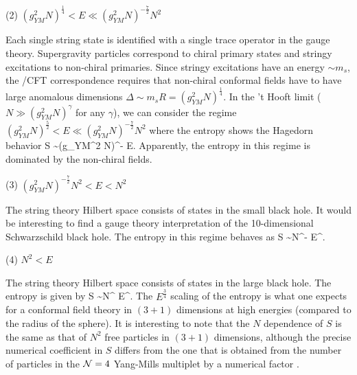 \noindent
(2) $(g_{YM}^2N)^{\frac{1}{4}} < E \ll (g_{YM}^2
    N)^{-\frac{7}{2}} N^2$

Each single string state is identified with a single
trace operator in the gauge theory. Supergravity
particles correspond to chiral primary states and
stringy excitations to non-chiral primaries.
Since stringy excitations have an energy $\sim m_s$,
the \ads/CFT correspondence
requires that non-chiral conformal fields have to 
have large anomalous dimensions 
$\Delta \sim m_s R = (g_{YM}^2 N)^{\frac{1}{4}}$.
In the 't Hooft limit ($N \gg (g_{YM}^2 N)^\gamma$
for any $\gamma$), we can consider
the regime $(g_{YM}^2 N)^{\frac{5}{2}} <
E \ll (g_{YM}^2 N)^{-\frac{7}{2}} N^2$ where
the entropy shows the Hagedorn behavior
\beq
  S \sim (g_{YM}^2 N)^{-} E.
\eeq
Apparently, the entropy in this regime is dominated by
the non-chiral fields.


\noindent
(3) $ (g_{YM}^2
    N)^{-\frac{7}{2}} N^2 < E < N^2$

The string theory Hilbert space consists of
states in the small black hole. It would
be interesting to find a gauge theory interpretation 
of the 10-dimensional Schwarzschild black hole.
The entropy in this regime behaves as
\beq
  S \sim N^{-} E^{}.
\eeq

\noindent
(4) $N^2 < E$

The string theory Hilbert space consists of
states in the large black hole. The entropy is given
by 
\beq
 S \sim N^{} E^{}.
\eeq
The $E^{\frac{3}{4}}$ scaling of the entropy is what one expects  
for a conformal field theory in $(3+1)$ dimensions at high energies
(compared to the radius of the sphere). 
It is interesting to note that the $N$ dependence of $S$
is the same as that of $N^2$ free particles in 
$(3+1)$ dimensions, although the precise numerical 
coefficient in $S$ differs from the one that is obtained
from the number of particles in the ${\cal N}=4$
Yang-Mills multiplet by a numerical factor \cite{Gubser:1996de}.





